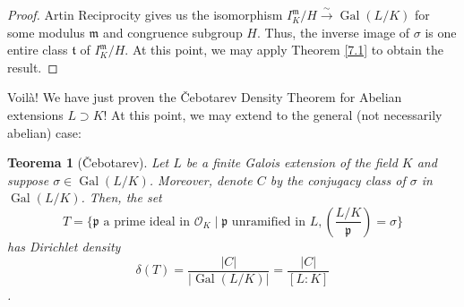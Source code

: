 \documentclass{article}
\DeclareMathOperator{\Gal}{Gal}
\theoremstyle{plain}
\newtheorem{thm}{Teorema}
\theoremstyle{definition}
\theoremstyle{remark}
\numberwithin{equation}{section}
\numberwithin{thm}{section}
\begin{document}
\begin{proof}
Artin Reciprocity gives us the isomorphism $I_{K}^{\mathfrak{m}}/H \xrightarrow{\sim} \Gal(L/K)$ for some modulus $\mathfrak{m}$ and congruence subgroup $H$. Thus, the inverse image of $\sigma$ is one entire class $\mathfrak{t}$ of $I_{K}^{\mathfrak{m}}/H$. At this point, we may apply Theorem \ref{7.1} to obtain the result. 
\end{proof}

Voilà! We have just proven the Čebotarev Density Theorem for Abelian extensions $L \supset K$! At this point, we may extend to the general (not necessarily abelian) case:

\begin{thm}[Čebotarev]
Let $L$ be a finite Galois extension of the field $K$ and suppose $\sigma \in \Gal(L/K)$. Moreover, denote $C$ by the conjugacy class of $\sigma$ in $\Gal(L/K)$. Then, the set $$T = \{\mathfrak{p} \text{ a prime ideal in } \mathcal{O}_K \mid \mathfrak{p} \text{ unramified in } L, \left(\frac{L/K}{\mathfrak{p}}\right) = \sigma\}$$ has Dirichlet density $$ \delta(T) = \frac{|C|}{|\Gal(L/K)|} = \frac{|C|}{[L : K]}$$. 
\end{thm}
\end{document}
